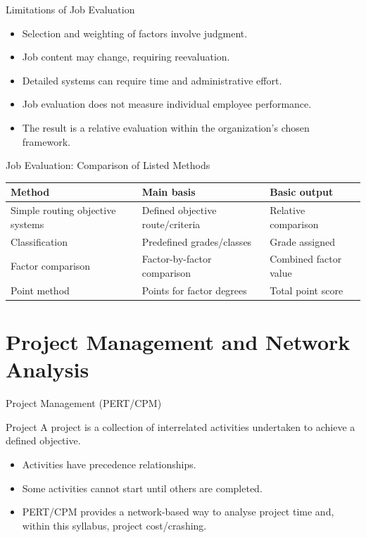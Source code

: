\documentclass[aspectratio=169,10pt]{beamer}
\begin{document}
\begin{frame}{Limitations of Job Evaluation}
\begin{itemize}
  \item Selection and weighting of factors involve judgment.
  \item Job content may change, requiring reevaluation.
  \item Detailed systems can require time and administrative effort.
  \item Job evaluation does not measure individual employee performance.
  \item The result is a relative evaluation within the organization's chosen framework.
\end{itemize}
\end{frame}

\begin{frame}{Job Evaluation: Comparison of Listed Methods}
\centering
\small
\begin{tabular}{l|l|l}
\toprule
Method & Main basis & Basic output\\
\midrule
Simple routing objective systems & Defined objective route/criteria & Relative comparison\\
Classification & Predefined grades/classes & Grade assigned\\
Factor comparison & Factor-by-factor comparison & Combined factor value\\
Point method & Points for factor degrees & Total point score\\
\bottomrule
\end{tabular}
\end{frame}

\section{Project Management and Network Analysis}

\begin{frame}{Project Management (PERT/CPM)}
\begin{block}{Project}
A project is a collection of interrelated activities undertaken to achieve a defined objective.
\end{block}
\begin{itemize}
  \item Activities have precedence relationships.
  \item Some activities cannot start until others are completed.
  \item PERT/CPM provides a network-based way to analyse project time and, within this syllabus, project cost/crashing.
\end{itemize}
\end{frame}
\end{document}

